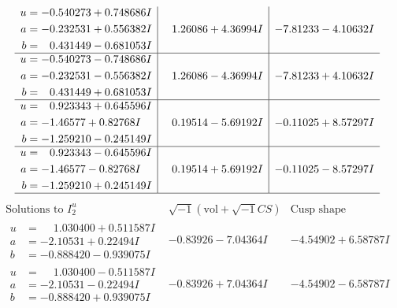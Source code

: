 \documentclass[1p]{elsarticle_modified}
\theoremstyle{definition}
\newcommand{\I}{\sqrt{-1}}
\begin{document}
$$\begin{array}{c|c|c}
\begin{aligned}
u &= -0.540273 + 0.748686 I \\
a &= -0.232531 + 0.556382 I \\
b &= \phantom{-}0.431449 - 0.681053 I\end{aligned}
 & \phantom{-}1.26086 + 4.36994 I & -7.81233 - 4.10632 I \\ \hline\begin{aligned}
u &= -0.540273 - 0.748686 I \\
a &= -0.232531 - 0.556382 I \\
b &= \phantom{-}0.431449 + 0.681053 I\end{aligned}
 & \phantom{-}1.26086 - 4.36994 I & -7.81233 + 4.10632 I \\ \hline\begin{aligned}
u &= \phantom{-}0.923343 + 0.645596 I \\
a &= -1.46577 + 0.82768 I \\
b &= -1.259210 - 0.245149 I\end{aligned}
 & \phantom{-}0.19514 - 5.69192 I & -0.11025 + 8.57297 I \\ \hline\begin{aligned}
u &= \phantom{-}0.923343 - 0.645596 I \\
a &= -1.46577 - 0.82768 I \\
b &= -1.259210 + 0.245149 I\end{aligned}
 & \phantom{-}0.19514 + 5.69192 I & -0.11025 - 8.57297 I\\
 \hline 
 \end{array}$$\newpage$$\begin{array}{c|c|c}  
\text{Solutions to }I^u_{2}& \I (\text{vol} + \sqrt{-1}CS) & \text{Cusp shape}\\
 \hline 
\begin{aligned}
u &= \phantom{-}1.030400 + 0.511587 I \\
a &= -2.10531 + 0.22494 I \\
b &= -0.888420 - 0.939075 I\end{aligned}
 & -0.83926 - 7.04364 I & -4.54902 + 6.58787 I \\ \hline\begin{aligned}
u &= \phantom{-}1.030400 - 0.511587 I \\
a &= -2.10531 - 0.22494 I \\
b &= -0.888420 + 0.939075 I\end{aligned}
 & -0.83926 + 7.04364 I & -4.54902 - 6.58787 I \\ \hline\begin{aligned}

\end{aligned}
\end{array}$$
\end{document}

